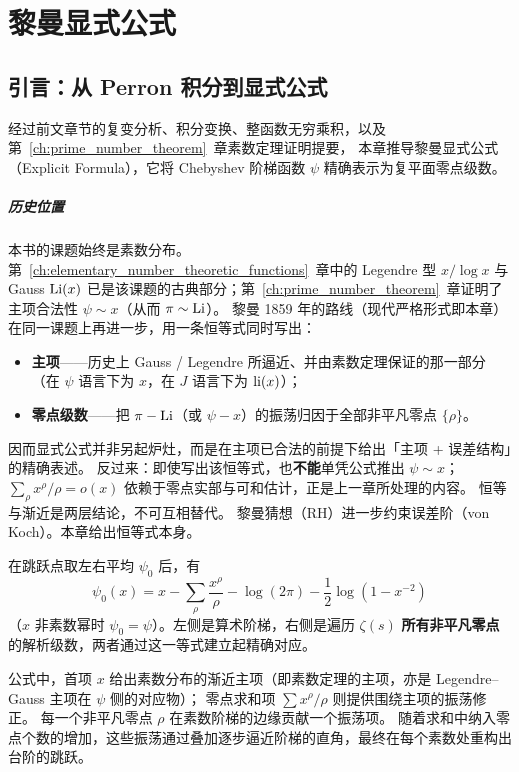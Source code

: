 \chapter{黎曼显式公式}\label{ch:riemann_explicit_formula}

\section{引言：从 Perron 积分到显式公式}\label{sec:riemann_explicit_intro}

经过前文章节的复变分析、积分变换、整函数无穷乘积，以及第~\ref{ch:prime_number_theorem}~章素数定理证明提要，
本章推导黎曼显式公式（Explicit Formula），它将 Chebyshev 阶梯函数 $\psi$ 精确表示为复平面零点级数。

\paragraph{历史位置}
本书的课题始终是素数分布。
第~\ref{ch:elementary_number_theoretic_functions}~章中的 Legendre 型 $x/\log x$ 与 Gauss $\operatorname{Li}(x)$
已是该课题的古典部分；第~\ref{ch:prime_number_theorem}~章证明了主项合法性 $\psi\sim x$（从而 $\pi\sim\operatorname{Li}$）。
黎曼 1859 年的路线（现代严格形式即本章）在同一课题上再进一步，用一条恒等式同时写出：
\begin{itemize}
  \item \textbf{主项}——历史上 Gauss / Legendre 所逼近、并由素数定理保证的那一部分（在 $\psi$ 语言下为 $x$，在 $J$ 语言下为 $\operatorname{li}(x)$）；
  \item \textbf{零点级数}——把 $\pi-\operatorname{Li}$（或 $\psi-x$）的振荡归因于全部非平凡零点 $\{\rho\}$。
\end{itemize}
因而显式公式并非另起炉灶，而是在主项已合法的前提下给出「主项 + 误差结构」的精确表述。
反过来：即使写出该恒等式，也\textbf{不能}单凭公式推出 $\psi\sim x$；
$\sum_{\rho}x^{\rho}/\rho=o(x)$ 依赖于零点实部与可和估计，正是上一章所处理的内容。
恒等与渐近是两层结论，不可互相替代。
黎曼猜想（RH）进一步约束误差阶（von Koch）。本章给出恒等式本身。

在跳跃点取左右平均 $\psi_0$ 后，有
\[
\psi_0(x) = x - \sum_{\rho}\frac{x^{\rho}}{\rho} - \log(2\pi) - \frac12\log(1-x^{-2})
\]
（$x$ 非素数幂时 $\psi_0=\psi$）。左侧是算术阶梯，右侧是遍历 $\zeta(s)$ \textbf{所有非平凡零点}的解析级数，两者通过这一等式建立起精确对应。

公式中，首项 $x$ 给出素数分布的渐近主项（即素数定理的主项，亦是 Legendre--Gauss 主项在 $\psi$ 侧的对应物）；
零点求和项 $\sum x^\rho/\rho$ 则提供围绕主项的振荡修正。
每一个非平凡零点 $\rho$ 在素数阶梯的边缘贡献一个振荡项。
随着求和中纳入零点个数的增加，这些振荡通过叠加逐步逼近阶梯的直角，最终在每个素数处重构出台阶的跳跃。

